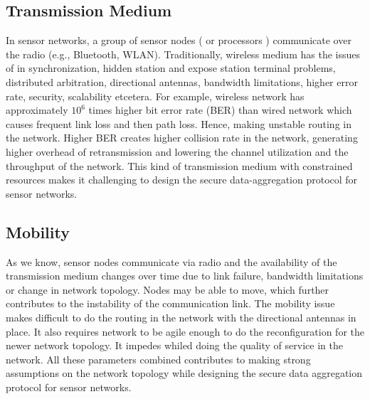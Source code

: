 	\subsection{Transmission Medium}
		In sensor networks, a group of sensor nodes ( or processors ) communicate over the radio (e.g., Bluetooth, WLAN).
		Traditionally, wireless medium has the issues of in synchronization, hidden station and expose station terminal problems, distributed arbitration, directional antennas, bandwidth limitations, higher error rate, security, scalability etcetera.
		For example, wireless network has approximately $10^6$ times higher bit error rate (BER) than wired network which causes frequent link loss and then path loss. 
		Hence, making unstable routing in the network.
		Higher BER creates higher collision rate in the network, generating higher overhead of retransmission and lowering the channel utilization and the throughput of the network.
		This kind of transmission medium with constrained resources makes it challenging to design the secure data-aggregation protocol for sensor networks.

	\subsection{Mobility}
		As we know, sensor nodes communicate via radio and the availability of the transmission medium changes over time due to link failure, bandwidth limitations or change in network topology.
		Nodes may be able to move, which further contributes to the instability of the communication link.
		The mobility issue makes difficult to do the routing in the network with the directional antennas in place.
		It also requires network to be agile enough to do the reconfiguration for the newer network topology.
		It impedes whiled doing the quality of service in the network. 
		All these parameters combined contributes to making strong assumptions on the network topology while designing the secure data aggregation protocol for sensor networks.

